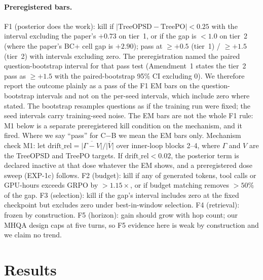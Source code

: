 \documentclass[11pt]{article}
\begin{document}
\paragraph{Preregistered bars.} F1 (posterior does the work): kill if
$|\text{TreeOPSD}-\text{TreePO}|<0.25$ with the interval excluding the
paper's $+0.73$ on tier~1, or if the gap is $<1.0$ on tier~2 (where the
paper's BC+ cell gap is $+2.90$); pass at $\geq +0.5$ (tier~1) /
$\geq +1.5$ (tier~2) with intervals excluding zero. The preregistration
named the paired question-bootstrap interval for that pass test
(Amendment~1 states the tier~2 pass as $\geq +1.5$ with the
paired-bootstrap 95\% CI excluding 0). We therefore report the outcome
plainly as a pass of the F1 EM bars on the question-bootstrap intervals
and not on the per-seed intervals, which include zero where stated. The
bootstrap resamples questions as if the training run were fixed; the
seed intervals carry training-seed noise. The EM bars are not the whole
F1 rule: M1 below is a separate preregistered kill condition on the
mechanism, and it fired. Where we say ``pass'' for C$-$B we mean the EM
bars only. Mechanism check M1: let
$\mathrm{drift\_rel}=\overline{|\Gamma-V|}/\overline{|V|}$ over inner-loop
blocks 2--4, where $\Gamma$ and $V$ are the TreeOPSD and TreePO targets.
If $\mathrm{drift\_rel}<0.02$, the posterior term is declared inactive at
that dose whatever the EM shows, and a preregistered dose sweep
(EXP-1c) follows. F2 (budget): kill if any of generated tokens, tool
calls or GPU-hours exceeds GRPO by $>1.15\times$, or if budget matching
removes $>50\%$ of the gap. F3 (selection): kill if the gap's interval
includes zero at the fixed checkpoint but excludes zero under
best-in-window selection. F4 (retrieval): frozen by construction. F5
(horizon): gain should grow with hop count; our MHQA design caps at five
turns, so F5 evidence here is weak by construction and we claim no trend.

\section{Results}
\end{document}
